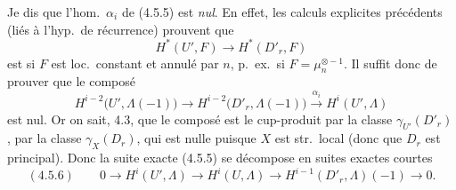 \documentclass[11pt,a4paper]{article}
\begin{document}

 

Je dis que l'hom.\ $\alpha_i$ de (4.5.5) est \emph{nul}. En effet, les calculs explicites précédents (liés à l'hyp.\ de récurrence) prouvent que
\[
H^*(U', F) \longrightarrow H^*(D'_r, F)
\]
est   si $F$ est loc.\ constant et annulé par $n$, p.\ ex.\ si $F = \mu_n^{\otimes -1}$. Il suffit donc de prouver que le composé
\[
H^{i-2}\bigl(U', \Lambda(-1)\bigr) \longrightarrow H^{i-2}\bigl(D'_r, \Lambda(-1)\bigr) \xrightarrow{\alpha_i} H^i(U', \Lambda)
\]
est nul. Or on sait,  4.3, \struck{\ill{}} que le composé est le cup-produit par la classe  $\gamma_{U'}(D'_r)$ , \struck{\ill{}}  par la classe \struck{\ill{}} $\gamma_X(D_r)$, qui est nulle puisque $X$ est str.\ local (donc que $D_r$ est principal). Donc la suite exacte (4.5.5) se décompose en suites exactes courtes
\[
(4.5.6) \qquad 0 \to H^i(U', \Lambda) \to H^i(U, \Lambda) \to H^{i-1}(D'_r, \Lambda)(-1) \to 0 .
\]


\end{document}
